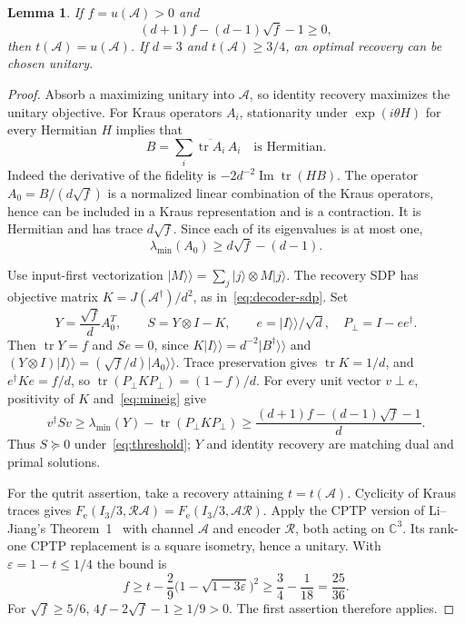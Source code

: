 \documentclass[11pt]{article}
\newcommand{\tr}{\operatorname{tr}}
\newcommand{\ket}[1]{\lvert#1\rangle}
\newcommand{\R}{\mathcal R}
\newcommand{\F}{F_{\mathrm e}}
\newtheorem{lemma}{Lemma}
\begin{document}
\begin{lemma}\label{lem:unitary}
If $f=u(\mathcal A)>0$ and
\begin{equation}\label{eq:threshold}
 (d+1)f-(d-1)\sqrt f-1\ge0,
\end{equation}
then $t(\mathcal A)=u(\mathcal A)$. If $d=3$ and
$t(\mathcal A)\ge3/4$, an optimal recovery can be chosen unitary.
\end{lemma}
\begin{proof}
Absorb a maximizing unitary into $\mathcal A$, so identity recovery
maximizes the unitary objective. For Kraus operators $A_i$, stationarity
under $\exp(i\theta H)$ for every Hermitian $H$ implies that
\[
 B=\sum_i\overline{\tr A_i}\,A_i
 \quad\text{is Hermitian}.
\]
Indeed the derivative of the fidelity is $-2d^{-2}\operatorname{Im}\tr(HB)$.
The operator $A_0=B/(d\sqrt f)$ is a normalized linear combination of the
Kraus operators, hence can be included in a Kraus representation and is a
contraction. It is Hermitian and has trace $d\sqrt f$. Since each of its
eigenvalues is at most one,
\begin{equation}\label{eq:mineig}
 \lambda_{\min}(A_0)\ge d\sqrt f-(d-1).
\end{equation}

Use input-first vectorization $\ket{M}\!\rangle=\sum_j\ket j\otimes M\ket j$.
The recovery SDP has objective matrix $K=J(\mathcal A^\dagger)/d^2$,
as in~\eqref{eq:decoder-sdp}. Set
\[
 Y=\frac{\sqrt f}{d}A_0^T,\qquad S=Y\otimes I-K,
 \qquad e=\ket I\!\rangle/\sqrt d,\quad P_\perp=I-ee^\dagger.
\]
Then $\tr Y=f$ and $Se=0$, since
$K\ket I\!\rangle=d^{-2}\ket{B^\dagger}\!\rangle$
and $(Y\otimes I)\ket I\!\rangle=(\sqrt f/d)\ket{A_0}\!\rangle$.
Trace preservation gives $\tr K=1/d$, and
$e^\dagger Ke=f/d$, so
$\tr(P_\perp K P_\perp)=(1-f)/d$.
For every unit vector $v\perp e$, positivity of $K$ and~\eqref{eq:mineig} give
\[
 v^\dagger Sv\ge\lambda_{\min}(Y)-\tr(P_\perp K P_\perp)
 \ge\frac{(d+1)f-(d-1)\sqrt f-1}{d}.
\]
Thus $S\succeq0$ under~\eqref{eq:threshold}; $Y$ and identity recovery
are matching dual and primal solutions.

For the qutrit assertion, take a recovery attaining $t=t(\mathcal A)$.
Cyclicity of Kraus traces gives $\F(I_3/3,\R\mathcal A)=
\F(I_3/3,\mathcal A\R)$. Apply the CPTP version of
Li--Jiang's Theorem~1~\cite{LiJiang} with channel $\mathcal A$ and encoder
$\R$, both acting on $\mathbb C^3$. Its rank-one CPTP replacement is a
square isometry, hence a unitary. With $\varepsilon=1-t\le1/4$ the bound is
\[
 f\ge t-\frac29\bigl(1-\sqrt{1-3\varepsilon}\bigr)^2
 \ge\frac34-\frac1{18}=\frac{25}{36}.
\]
For $\sqrt f\ge5/6$, $4f-2\sqrt f-1\ge1/9>0$.
The first assertion therefore applies.
\end{proof}
\end{document}
